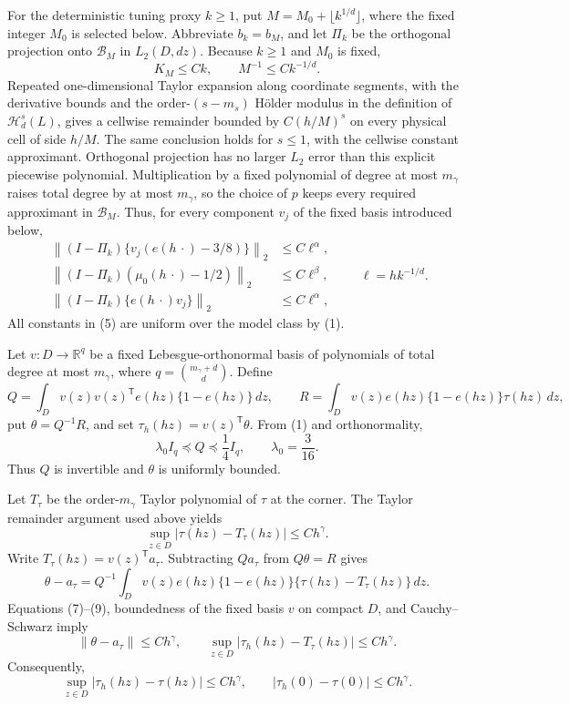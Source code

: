 For the deterministic tuning proxy \(k\geq1\), put \(M=M_0+\lfloor k^{1/d}\rfloor\), where the fixed integer \(M_0\) is selected below.  Abbreviate \(b_k=b_M\), and let \(\Pi_k\) be the orthogonal projection onto \(\mathcal B_M\) in \(L_2(D,dz)\).  Because \(k\geq1\) and \(M_0\) is fixed,
\[
 K_M\leq Ck,
 \qquad M^{-1}\leq Ck^{-1/d}.
 \tag{4}
\]
Repeated one-dimensional Taylor expansion along coordinate segments, with the derivative bounds and the order-\((s-m_s)\) H\"older modulus in the definition of \(\mathcal H_d^s(L)\), gives a cellwise remainder bounded by \(C(h/M)^s\) on every physical cell of side \(h/M\).  The same conclusion holds for \(s\leq1\), with the cellwise constant approximant.  Orthogonal projection has no larger \(L_2\) error than this explicit piecewise polynomial.  Multiplication by a fixed polynomial of degree at most \(m_\gamma\) raises total degree by at most \(m_\gamma\), so the choice of \(p\) keeps every required approximant in \(\mathcal B_M\).  Thus, for every component \(v_j\) of the fixed basis introduced below,
\[
 \begin{split}
 \left\|(I-\Pi_k)\{v_j(e(h\,\cdot)-3/8)\}\right\|_2&\leq C\ell^\alpha,\\
 \left\|(I-\Pi_k)(\mu_0(h\,\cdot)-1/2)\right\|_2&\leq C\ell^\beta,\\
 \left\|(I-\Pi_k)\{e(h\,\cdot)v_j\}\right\|_2&\leq C\ell^\alpha,
 \end{split}
 \qquad \ell=hk^{-1/d}.
 \tag{5}
\]
All constants in (5) are uniform over the model class by (1).

Let \(v:D\to\mathbb R^q\) be a fixed Lebesgue-orthonormal basis of polynomials of total degree at most \(m_\gamma\), where \(q=\binom{m_\gamma+d}{d}\).  Define
\[
 Q=\int_Dv(z)v(z)^{\mathsf T}e(hz)\{1-e(hz)\}\,dz,
 \qquad
 R=\int_Dv(z)e(hz)\{1-e(hz)\}\tau(hz)\,dz,
 \tag{6}
\]
put \(\theta=Q^{-1}R\), and set \(\tau_h(hz)=v(z)^{\mathsf T}\theta\).  From (1) and orthonormality,
\[
 \lambda_0 I_q\preceq Q\preceq\frac14I_q,
 \qquad \lambda_0=\frac3{16}.
 \tag{7}
\]
Thus \(Q\) is invertible and \(\theta\) is uniformly bounded.

Let \(T_\tau\) be the order-\(m_\gamma\) Taylor polynomial of \(\tau\) at the corner.  The Taylor remainder argument used above yields
\[
 \sup_{z\in D}|\tau(hz)-T_\tau(hz)|\leq Ch^\gamma.
 \tag{8}
\]
Write \(T_\tau(hz)=v(z)^{\mathsf T}a_\tau\).  Subtracting \(Qa_\tau\) from \(Q\theta=R\) gives
\[
 \theta-a_\tau
 =Q^{-1}\int_Dv(z)e(hz)\{1-e(hz)\}
 \{\tau(hz)-T_\tau(hz)\}\,dz.
 \tag{9}
\]
Equations (7)--(9), boundedness of the fixed basis \(v\) on compact \(D\), and Cauchy--Schwarz imply
\[
 \|\theta-a_\tau\|\leq Ch^\gamma,
 \qquad
 \sup_{z\in D}|\tau_h(hz)-T_\tau(hz)|\leq Ch^\gamma.
 \tag{10}
\]
Consequently,
\[
 \sup_{z\in D}|\tau_h(hz)-\tau(hz)|\leq Ch^\gamma,
 \qquad
 |\tau_h(0)-\tau(0)|\leq Ch^\gamma.
 \tag{11}
\]

